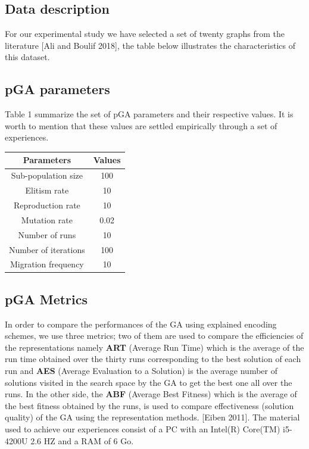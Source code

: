 \documentclass[review]{elsarticle}
\begin{document}
\subsection{Data description}
For our experimental study we have selected a set of twenty graphs from the literature [Ali and Boulif 2018], the table below illustrates the characteristics of this dataset.
 

\subsection{pGA parameters}
Table 1 summarize the set of pGA parameters and their respective values. It is worth to mention that these values are settled empirically through a set of experiences.

\begin{table}[H]
	\center
	\label{tab:AG} %
	\begin{tabular}{c c}
		\hline
	    \bf  Parameters & Values \\
		\hline 
			 Sub-population size  & 100 \\
			 Elitism rate   & 10 \\		 
			 Reproduction rate   & 10 \\
			 Mutation rate   & 0.02 \\
			 Number of runs   & 10 \\	
			 Number of iterations   & 100 \\	
			 Migration frequency   & 10 \\	   		 		
		\hline
	\end{tabular}
\end{table}

\subsection{pGA Metrics }
In order to compare the performances of the GA using explained encoding schemes, we use three metrics; two of them are used to compare the efficiencies of the representations namely \textbf{ART} (Average Run Time) which is the average of the run time obtained over the thirty runs corresponding to the best solution of each run and \textbf{AES} (Average Evaluation to a Solution) is the average number of solutions visited in the search space by the GA to get the best one all over the runs. In the other side, the \textbf{ABF} (Average Best Fitness) which is the average of the best fitness obtained by the runs, is used to compare effectiveness (solution quality) of the GA using the representation methods. [Eiben 2011].
The material used to achieve our experiences consist of a PC with an Intel(R) Core(TM) i5-4200U 2.6 HZ and a RAM of 6 Go. 
\end{document}
